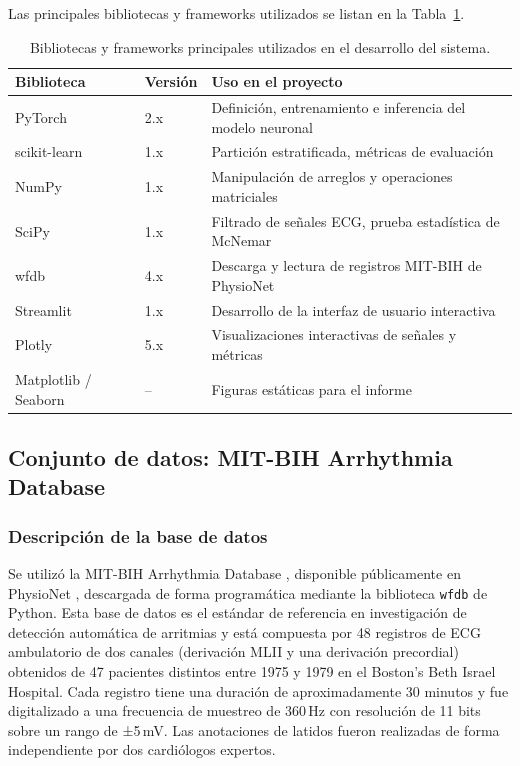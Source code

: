 Las principales bibliotecas y frameworks utilizados se listan en la Tabla~\ref{T_herramientas}.

\begin{table}[h]
\caption{Bibliotecas y frameworks principales utilizados en el desarrollo del sistema.}
\label{T_herramientas}
\begin{center}
\begin{tabular}{lll}
\hline
\textbf{Biblioteca} & \textbf{Versión} & \textbf{Uso en el proyecto} \\ \hline
PyTorch          & 2.x   & Definición, entrenamiento e inferencia del modelo neuronal \\
scikit-learn     & 1.x   & Partición estratificada, métricas de evaluación \\
NumPy            & 1.x   & Manipulación de arreglos y operaciones matriciales \\
SciPy            & 1.x   & Filtrado de señales ECG, prueba estadística de McNemar \\
wfdb             & 4.x   & Descarga y lectura de registros MIT-BIH de PhysioNet \\
Streamlit        & 1.x   & Desarrollo de la interfaz de usuario interactiva \\
Plotly           & 5.x   & Visualizaciones interactivas de señales y métricas \\
Matplotlib / Seaborn & -- & Figuras estáticas para el informe \\
\hline
\end{tabular}
\end{center}
\end{table}

\subsection{Conjunto de datos: MIT-BIH Arrhythmia Database}

\subsubsection{Descripción de la base de datos}

Se utilizó la MIT-BIH Arrhythmia Database \cite{Moody2001}, disponible públicamente en PhysioNet \cite{Goldberger2000}, descargada de forma programática mediante la biblioteca \texttt{wfdb} de Python. Esta base de datos es el estándar de referencia en investigación de detección automática de arritmias y está compuesta por 48 registros de ECG ambulatorio de dos canales (derivación MLII y una derivación precordial) obtenidos de 47 pacientes distintos entre 1975 y 1979 en el Boston's Beth Israel Hospital. Cada registro tiene una duración de aproximadamente 30 minutos y fue digitalizado a una frecuencia de muestreo de 360\,Hz con resolución de 11 bits sobre un rango de ±5\,mV. Las anotaciones de latidos fueron realizadas de forma independiente por dos cardiólogos expertos.


